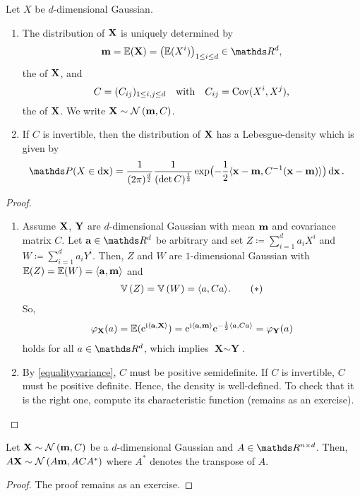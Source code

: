 \begin{thm}\label{ddimgaussdist}
Let $X$ be $d$-dimensional Gaussian.
\begin{enumerate}[label=(\alph*)]
\item The distribution of $\mathbf{X}$ is uniquely determined by
	\[\m = \E{\X} = \bigl(\E[norm]{X^i}\bigr)_{1\leq i\leq d} \in \Rd,\]
	the  of $\mathbf{X}$,
	and
	\[
		C = (C_{ij})_{1\leq i,j\leq d}
		\quad\text{with}\quad
		C_{ij} = \operatorname{Cov}(X^i, X^j),
	\]
	the  of $\mathbf{X}$.
	We write $\mathbf{X} \sim \mathcal{N}\left(\mathbf{m},C\right)$.
\item If $C$ is invertible,
	then the distribution of $\mathbf{X}$ has a Lebesgue-density
	which is given by
	\begin{align*}
		\Prob(X \in {\ud{\x}})
		&= \frac{1}{(2 \pi)^{\frac{d}{2}}}
		   \frac{1}{(\det C)^{\frac{1}{2}}}
		   \exp\bigl(-\frac{1}{2} \sp{\x-\m}{C^{-1}(\x-\m)}\bigr)
		   \ud{\x}.
	\qedhere
	\end{align*}
\end{enumerate}
\end{thm}
\begin{proof}
\begin{enumerate}[label=(\alph*)]
\item Assume $\mathbf{X}$, $\mathbf{Y}$ are $d$-dimensional Gaussian
	with mean $\mathbf{m}$ and covariance matrix $C$.
	Let $\ba \in \Rd$ be arbitrary
	and set $Z \coloneqq \sum_{i=1}^d a_iX^i$
	and $W \coloneqq \sum_{i=1}^d a_iY^i$.
	Then, $Z$ and $W$ are $1$-dimensional Gaussian
	with $\E{Z} = \E{W} = \sp{\ba}{\m}$ and
\begin{align*}\label{equalityvariance}
	\V{Z} = \V{W} = \sp{a}{Ca}. \tag{\textast}
\end{align*}
So,
\begin{align*}
	\varphi_{\X}(a)
	= \E{\e^{\i \sp{\ba}{\X}}}
	= \e^{\i \sp{\ba}{\m}}\e^{-\frac{1}{2}\sp{a}{Ca}}
	= \varphi_{\Y}(a)
\end{align*}
holds for all $a\in\Rd$, which implies $\textbf{X}\sim \textbf{Y}$.
\item By \eqref{equalityvariance},
	$C$ must be positive semidefinite.
	If $C$ is invertible, $C$ must be positive definite.
	Hence, the density is well-defined.
	To check that it is the right one,
	compute its characteristic function (remains as an exercise).
	\qedhere
\end{enumerate}
\end{proof}

\begin{prop}
	Let $\mathbf{X} \sim \mathcal{N}\left(\mathbf{m},C\right)$ be a $d$-dimensional Gaussian \RV
	and $A \in \R^{n\times d}$.
	Then, $A\mathbf{X} \sim \mathcal{N}\left(A\mathbf{m},ACA^\ast\right)$
	where $A^\ast$ denotes the transpose of $A$.
\end{prop}
\begin{proof}
	The proof remains as an exercise.
\end{proof}

